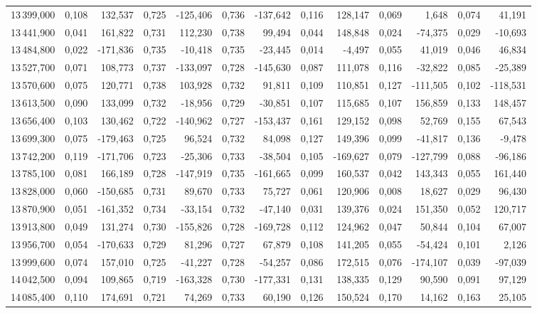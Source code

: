 \begin{longtable}{rrrrrrrrrrrrr}
13\,399,000 & 0,108 & 132,537 & 0,725 & -125,406 & 0,736 & -137,642 & 0,116 & 128,147 & 0,069 & 1,648 & 0,074 & 41,191\\
13\,441,900 & 0,041 & 161,822 & 0,731 & 112,230 & 0,738 & 99,494 & 0,044 & 148,848 & 0,024 & -74,375 & 0,029 & -10,693\\
13\,484,800 & 0,022 & -171,836 & 0,735 & -10,418 & 0,735 & -23,445 & 0,014 & -4,497 & 0,055 & 41,019 & 0,046 & 46,834\\
13\,527,700 & 0,071 & 108,773 & 0,737 & -133,097 & 0,728 & -145,630 & 0,087 & 111,078 & 0,116 & -32,822 & 0,085 & -25,389\\
13\,570,600 & 0,075 & 120,771 & 0,738 & 103,928 & 0,732 & 91,811 & 0,109 & 110,851 & 0,127 & -111,505 & 0,102 & -118,531\\
13\,613,500 & 0,090 & 133,099 & 0,732 & -18,956 & 0,729 & -30,851 & 0,107 & 115,685 & 0,107 & 156,859 & 0,133 & 148,457\\
13\,656,400 & 0,103 & 130,462 & 0,722 & -140,962 & 0,727 & -153,437 & 0,161 & 129,152 & 0,098 & 52,769 & 0,155 & 67,543\\
13\,699,300 & 0,075 & -179,463 & 0,725 & 96,524 & 0,732 & 84,098 & 0,127 & 149,396 & 0,099 & -41,817 & 0,136 & -9,478\\
13\,742,200 & 0,119 & -171,706 & 0,723 & -25,306 & 0,733 & -38,504 & 0,105 & -169,627 & 0,079 & -127,799 & 0,088 & -96,186\\
13\,785,100 & 0,081 & 166,189 & 0,728 & -147,919 & 0,735 & -161,665 & 0,099 & 160,537 & 0,042 & 143,343 & 0,055 & 161,440\\
13\,828,000 & 0,060 & -150,685 & 0,731 & 89,670 & 0,733 & 75,727 & 0,061 & 120,906 & 0,008 & 18,627 & 0,029 & 96,430\\
13\,870,900 & 0,051 & -161,352 & 0,734 & -33,154 & 0,732 & -47,140 & 0,031 & 139,376 & 0,024 & 151,350 & 0,052 & 120,717\\
13\,913,800 & 0,049 & 131,274 & 0,730 & -155,826 & 0,728 & -169,728 & 0,112 & 124,962 & 0,047 & 50,844 & 0,104 & 67,007\\
13\,956,700 & 0,054 & -170,633 & 0,729 & 81,296 & 0,727 & 67,879 & 0,108 & 141,205 & 0,055 & -54,424 & 0,101 & 2,126\\
13\,999,600 & 0,074 & 157,010 & 0,725 & -41,227 & 0,728 & -54,257 & 0,086 & 172,515 & 0,076 & -174,107 & 0,039 & -97,039\\
14\,042,500 & 0,094 & 109,865 & 0,719 & -163,328 & 0,730 & -177,331 & 0,131 & 138,335 & 0,129 & 90,590 & 0,091 & 97,129\\
14\,085,400 & 0,110 & 174,691 & 0,721 & 74,269 & 0,733 & 60,190 & 0,126 & 150,524 & 0,170 & 14,162 & 0,163 & 25,105\\

\end{longtable}
